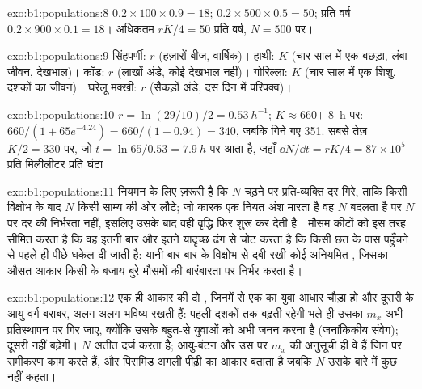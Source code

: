 \begin{solution}{exo:b1:populations:8}
$0.2\times 100\times 0.9 = 18$; $0.2\times 500\times 0.5 = 50$;
प्रति वर्ष $0.2\times 900\times 0.1 = 18$। अधिकतम $rK/4 = 50$ प्रति वर्ष,
$N = 500$ पर।
\end{solution}

\begin{solution}{exo:b1:populations:9}
सिंहपर्णी: $r$ (हज़ारों बीज, वार्षिक)। हाथी: $K$ (चार साल में एक
बछड़ा, लंबा जीवन, देखभाल)। कॉड: $r$ (लाखों अंडे, कोई देखभाल नहीं)।
गोरिल्ला: $K$ (चार साल में एक शिशु, दशकों का जीवन)। घरेलू मक्खी: $r$
(सैकड़ों अंडे, दस दिन में परिपक्व)।
\end{solution}

\begin{solution}{exo:b1:populations:10}
$r = \ln(29/10)/2 = \qty{0.53}{h^{-1}}$; $K \approx 660$। \qty{8}{h} पर:
$660/(1 + 65e^{-4.24}) = 660/(1 + 0.94) = 340$, जबकि गिने गए 351.
सबसे तेज़ $K/2 = 330$ पर, जो $t = \ln 65/0.53 = \qty{7.9}{h}$ पर आता है,
जहाँ $\dd N/\dd t = rK/4 = 87\times 10^5$  प्रति मिलीलीटर प्रति
घंटा।
\end{solution}

\begin{solution}{exo:b1:populations:11}
नियमन के लिए ज़रूरी है कि $N$ चढ़ने पर प्रति-व्यक्ति दर गिरे, ताकि
किसी विक्षोभ के बाद $N$ किसी साम्य की ओर लौटे; जो कारक
एक नियत अंश मारता है वह $N$ बदलता है पर $N$ पर दर की निर्भरता
नहीं, इसलिए उसके बाद  वही वृद्धि फिर शुरू कर देती है।
मौसम कीटों को इस तरह सीमित करता है कि वह इतनी बार और इतने यादृच्छ ढंग से
चोट करता है कि  किसी छत के पास पहुँचने से पहले ही पीछे धकेल दी जाती
है: यानी बार-बार के विक्षोभ से दबी रखी कोई अनियमित , जिसका
औसत आकार किसी  के बजाय बुरे मौसमों की बारंबारता पर निर्भर करता
है।
\end{solution}

\begin{solution}{exo:b1:populations:12}
एक ही आकार की दो , जिनमें से एक का युवा आधार चौड़ा हो और दूसरी के
आयु-वर्ग बराबर, अलग-अलग भविष्य रखती हैं: पहली दशकों तक बढ़ती रहेगी
भले ही उसका $m_x$ अभी प्रतिस्थापन पर गिर जाए, क्योंकि उसके
बहुत-से युवाओं को अभी जनन करना है (जनांकिकीय संवेग); दूसरी
नहीं बढ़ेगी। $N$ अतीत दर्ज करता है; आयु-बंटन और उस पर
$m_x$ की अनुसूची ही वे हैं जिन पर समीकरण काम करते हैं, और
पिरामिड अगली पीढ़ी का आकार बताता है जबकि $N$ उसके बारे में कुछ नहीं
कहता।
\end{solution}

